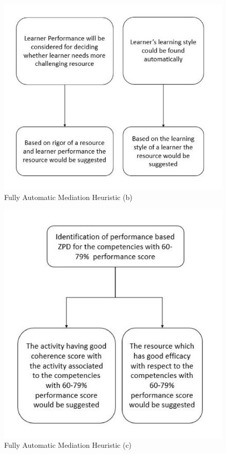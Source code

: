 \begin{multicols}{2}
\begin{figure}[H]
\centering
\includegraphics{src/Figures/chap2/chap2-fig06.jpg}
\caption{Fully Automatic Mediation Heuristic (b)}\label{chap2-fig06}
\end{figure}

\begin{figure}[H]
\centering
\includegraphics[scale=.85]{src/Figures/chap2/chap2-fig07.jpg}
\caption{Fully Automatic Mediation Heuristic (c)}\label{chap2-fig07}
\end{figure}


\end{multicols}

